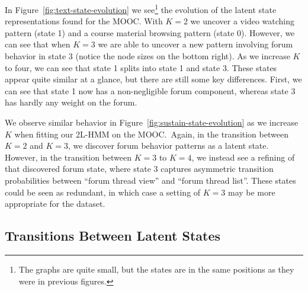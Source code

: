 In Figure~\ref{fig:text-state-evolution} we see\footnote{The graphs are
quite small, but the states are in the same positions as they were in
previous figures.} the evolution of the latent state
representations found for the \textretrieval{} MOOC.  With $K=2$ we uncover
a video watching pattern (state 1) and a course material browsing pattern
(state 0). However, we can see that when $K=3$ we are able to uncover a new
pattern involving forum behavior in state 3 (notice the node sizes on the
bottom right). As we increase $K$ to four, we can see that state 1 splits
into state 1 and state 3. These states appear quite similar at a glance,
but there are still some key differences. First, we can see that state 1
now has a non-negligible forum component, whereas state 3 has hardly any
weight on the forum.

We observe similar behavior in Figure~\ref{fig:sustain-state-evolution}
as we increase $K$ when fitting our 2L-HMM on the \sustain{} MOOC.\ Again,
in the transition between $K=2$ and $K=3$, we discover forum behavior
patterns as a latent state. However, in the transition between $K=3$ to
$K=4$, we instead see a refining of that discovered forum state, where
state 3 captures asymmetric transition probabilities between ``forum thread
view'' and ``forum thread list''. These states could be seen as redundant,
in which case a  setting of $K=3$ may be more appropriate for the
\sustain{} dataset.

\subsection{Transitions Between Latent States}

